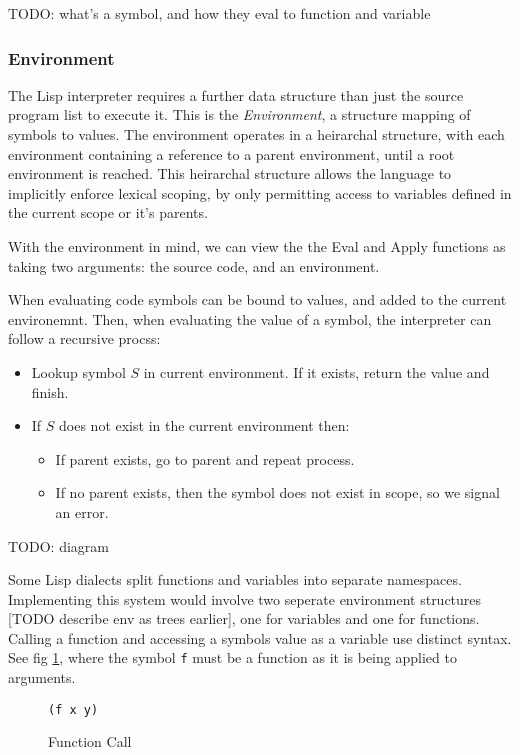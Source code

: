 \documentclass[11pt]{report}
\begin{document}
TODO: what's a symbol, and how they eval to function and variable

\subsubsection{Environment}
The Lisp interpreter requires a further data structure than just the source program list to execute it. This is the \textit{Environment}, a structure mapping of symbols to values. The environment operates in a heirarchal structure, with each environment containing a reference to a parent environment, until a root environment is reached. This heirarchal structure allows the language to implicitly enforce lexical scoping, by only permitting access to variables defined in the current scope or it's parents.

With the environment in mind, we can view the the Eval and Apply functions as taking two arguments: the source code, and an environment.

When evaluating code symbols can be bound to values, and added to the current environemnt. Then, when evaluating the value of a symbol, the interpreter can follow a recursive procss:

\begin{itemize}
\item Lookup symbol $S$ in current environment. If it exists, return the value and finish.
\item If $S$ does not exist in the current environment then:
  \begin{itemize}
  \item If parent exists, go to parent and repeat process.
  \item If no parent exists, then the symbol does not exist in scope, so we signal an error.
  \end{itemize}
\end{itemize}

TODO: diagram

Some Lisp dialects split functions and variables into separate namespaces. Implementing this system would involve two seperate environment structures [TODO describe env as trees earlier], one for variables and one for functions. Calling a function and accessing a symbols value as a variable use distinct syntax. See fig \ref{fig:funcall}, where the symbol \texttt{f} must be a function as it is being applied to arguments. 

\begin{figure}[hb]
  \centering
  \texttt{(f x y)}
  \caption{Function Call}
  \label{fig:funcall}
\end{figure}
\end{document}
